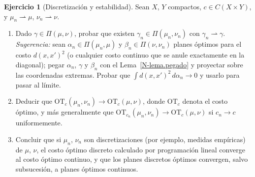 \documentclass[11pt,a4paper]{amsart}
\newcounter{chapter}
\theoremstyle{remark}
\theoremstyle{definition}
\newtheorem{ejercicio}{Ejercicio}[chapter]
\numberwithin{subsection}{section}
\numberwithin{equation}{section}
\begin{document}
\begin{ejercicio}[Discretización y estabilidad]\label{ejer.discretizacion.estabilidad}
Sean $X$, $Y$ compactos, $c\in C(X\times Y)$, y $\mu_n\rightharpoonup\mu$,
$\nu_n\rightharpoonup\nu$.
\begin{enumerate}[label=(\alph*)]
\item Dado $\gamma\in\Pi(\mu,\nu)$, probar que existen
$\gamma_n\in\Pi(\mu_n,\nu_n)$ con $\gamma_n\rightharpoonup\gamma$.
\emph{Sugerencia:} sean $\alpha_n\in\Pi(\mu_n,\mu)$ y $\beta_n\in\Pi(\nu,\nu_n)$
planes óptimos para el costo $d(x,x')^2$ (o cualquier costo continuo que
se anule exactamente en la diagonal); pegar $\alpha_n$, $\gamma$ y $\beta_n$
con el Lema~\ref{N-lema.pegado} y proyectar sobre las coordenadas
extremas. Probar que $\int d(x,x')^2\,d\alpha_n\to0$ y usarlo para pasar al límite.
\item Deducir que $\mathrm{OT}_c(\mu_n,\nu_n)\to\mathrm{OT}_c(\mu,\nu)$, donde
$\mathrm{OT}_c$ denota el costo óptimo, y más generalmente que
$\mathrm{OT}_{c_n}(\mu_n,\nu_n)\to\mathrm{OT}_c(\mu,\nu)$ si $c_n\to c$
uniformemente.
\item Concluir que si $\mu_n$, $\nu_n$ son discretizaciones (por ejemplo,
medidas empíricas) de $\mu$, $\nu$, el costo óptimo discreto calculado por
programación lineal converge al costo óptimo continuo, y que los planes
discretos óptimos convergen, salvo subsucesión, a planes óptimos continuos.
\end{enumerate}
\end{ejercicio}
\end{document}

